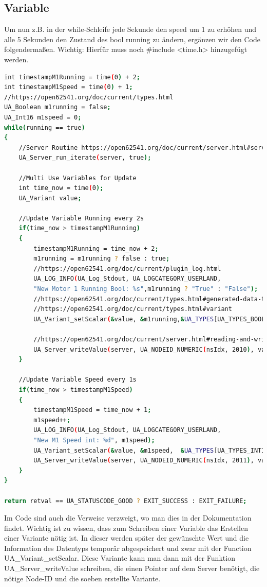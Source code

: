 \subsection{Variable}
Um nun z.B. in der while-Schleife jede Sekunde den speed um 1 zu erhöhen und alle 5 Sekunden den Zustand des bool running zu ändern, ergänzen wir den Code folgendermaßen.
Wichtig: Hierfür muss noch \#include <time.h> hinzugefügt werden.
\begin{lstlisting}[language=Bash]
int timestampM1Running = time(0) + 2;
int timestampM1Speed = time(0) + 1;
//https://open62541.org/doc/current/types.html
UA_Boolean m1running = false;
UA_Int16 m1speed = 0;
while(running == true)
{
	//Server Routine https://open62541.org/doc/current/server.html#server-lifecycle
	UA_Server_run_iterate(server, true);
	
	//Multi Use Variables for Update
	int time_now = time(0);
	UA_Variant value;
	
	//Update Variable Running every 2s
	if(time_now > timestampM1Running)
	{
		timestampM1Running = time_now + 2;
		m1running = m1running ? false : true;
		//https://open62541.org/doc/current/plugin_log.html
		UA_LOG_INFO(UA_Log_Stdout, UA_LOGCATEGORY_USERLAND,
		"New Motor 1 Running Bool: %s",m1running ? "True" : "False");
		//https://open62541.org/doc/current/types.html#generated-data-type-definitions
		//https://open62541.org/doc/current/types.html#variant
		UA_Variant_setScalar(&value, &m1running,&UA_TYPES[UA_TYPES_BOOLEAN]);
		
		//https://open62541.org/doc/current/server.html#reading-and-writing-node-attributes	
		UA_Server_writeValue(server, UA_NODEID_NUMERIC(nsIdx, 2010), val-ue);
	}
	
	//Update Variable Speed every 1s
	if(time_now > timestampM1Speed)
	{
		timestampM1Speed = time_now + 1;
		m1speed++;
		UA_LOG_INFO(UA_Log_Stdout, UA_LOGCATEGORY_USERLAND,
		"New M1 Speed int: %d", m1speed);
		UA_Variant_setScalar(&value, &m1speed,  &UA_TYPES[UA_TYPES_INT16]);
		UA_Server_writeValue(server, UA_NODEID_NUMERIC(nsIdx, 2011), val-ue);
	}
}

return retval == UA_STATUSCODE_GOOD ? EXIT_SUCCESS : EXIT_FAILURE;
\end{lstlisting}
Im Code sind auch die Verweise verzweigt, wo man dies in der Dokumentation findet. Wichtig ist zu wissen, dass zum Schreiben einer Variable das Erstellen einer Variante nötig ist. In dieser werden später der gewünschte Wert und die Information des Datentyps temporär abgespeichert und zwar mit der Function UA\_Variant\_setScalar.
Diese Variante kann man dann mit der Funktion UA\_Server\_writeValue schreiben,
die einen Pointer auf dem Server benötigt, die nötige Node-ID und die soeben erstellte Variante.

